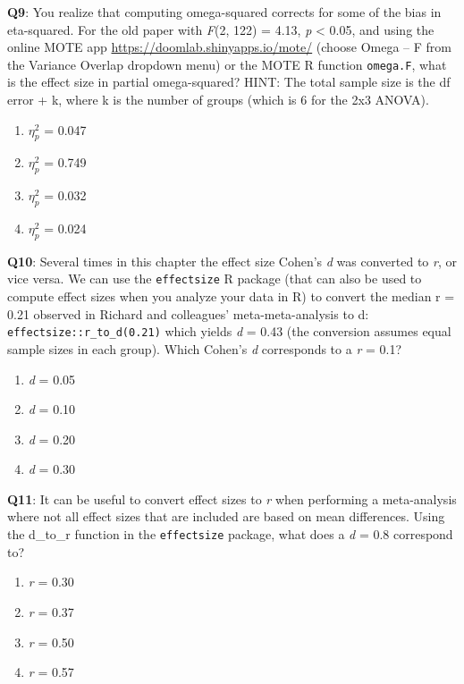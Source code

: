 \documentclass[
  oneside]{book}
\providecommand{\tightlist}{%
  \setlength{\itemsep}{0pt}\setlength{\parskip}{0pt}}
\begin{document}
\textbf{Q9}: You realize that computing omega-squared corrects for some of the bias in eta-squared. For the old paper with \emph{F}(2, 122) = 4.13, \emph{p} \textless{} 0.05, and using the online MOTE app \url{https://doomlab.shinyapps.io/mote/} (choose Omega -- F from the Variance Overlap dropdown menu) or the MOTE R function \texttt{omega.F}, what is the effect size in partial omega-squared? HINT: The total sample size is the df error + k, where k is the number of groups (which is 6 for the 2x3 ANOVA).

\begin{enumerate}
\def\labelenumi{\Alph{enumi})}
\tightlist
\item
  \(\eta_p^2\) = 0.047
\item
  \(\eta_p^2\) = 0.749
\item
  \(\eta_p^2\) = 0.032
\item
  \(\eta_p^2\) = 0.024
\end{enumerate}

\textbf{Q10}: Several times in this chapter the effect size Cohen's \emph{d} was converted to \emph{r}, or vice versa. We can use the \texttt{effectsize} R package (that can also be used to compute effect sizes when you analyze your data in R) to convert the median r = 0.21 observed in Richard and colleagues' meta-meta-analysis to d: \texttt{effectsize::r\_to\_d(0.21)} which yields \emph{d} = 0.43 (the conversion assumes equal sample sizes in each group). Which Cohen's \emph{d} corresponds to a \emph{r} = 0.1?

\begin{enumerate}
\def\labelenumi{\Alph{enumi})}
\tightlist
\item
  \emph{d} = 0.05
\item
  \emph{d} = 0.10
\item
  \emph{d} = 0.20
\item
  \emph{d} = 0.30
\end{enumerate}

\textbf{Q11}: It can be useful to convert effect sizes to \emph{r} when performing a meta-analysis where not all effect sizes that are included are based on mean differences. Using the d\_to\_r function in the \texttt{effectsize} package, what does a \emph{d} = 0.8 correspond to?

\begin{enumerate}
\def\labelenumi{\Alph{enumi})}
\tightlist
\item
  \emph{r} = 0.30
\item
  \emph{r} = 0.37
\item
  \emph{r} = 0.50
\item
  \emph{r} = 0.57
\end{enumerate}
\end{document}

